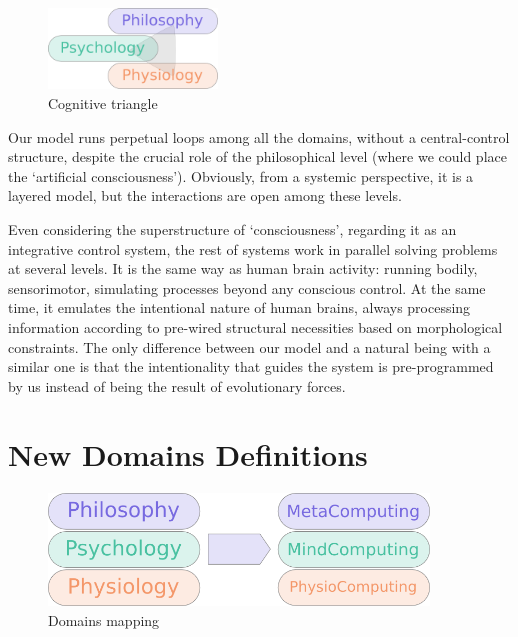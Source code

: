 \begin{figure}[htbp]
\centering

\includegraphics[width=0.4\textwidth]{cognitive_triangle}
\caption{Cognitive triangle }
\end{figure}

Our model runs perpetual loops among all the domains, without a
central-control structure, despite the crucial role of the philosophical
level (where we could place the `artificial consciousness'). Obviously,
from a systemic perspective, it is a layered model, but the interactions
are open among these levels.

Even considering the superstructure of `consciousness', regarding it as
an integrative control system, the rest of systems work in parallel
solving problems at several levels. It is the same way as human brain
activity: running bodily, sensorimotor, simulating processes beyond any
conscious control. At the same time, it emulates the intentional nature
of human brains, always processing information according to pre-wired
structural necessities based on morphological constraints. The only
difference between our model and a natural being with a similar one is
that the intentionality that guides the system is pre-programmed by us
instead of being the result of evolutionary forces.

\section{New Domains Definitions}\label{new-domains-definitions}

\begin{figure}[htbp]
\centering

\includegraphics[width=0.9\textwidth]{p3_model}
\caption{Domains mapping}
\end{figure}

